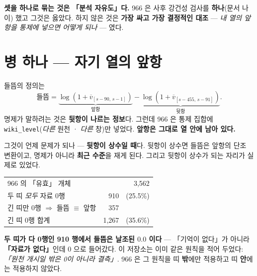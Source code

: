 \documentclass[10pt]{article}
\begin{document}
\textbf{셋을 하나로 묶는 것은 「분석 자유도」다.} 966 은 사후 강건성 검사를
\textbf{하나}(문서 나이) 했고 그것은 옳았다. 하지 않은 것은 \textbf{가장 싸고 가장
결정적인 대조} --- \emph{내 열의 앞항을 통제에 넣으면 어떻게 되나} --- 였다.

\section{병 하나 --- 자기 열의 앞항}

들뜸의 정의는
\[
\text{들뜸}=\underbrace{\log(1+\overline{v}_{[s-90,\,s-1]})}_{\text{앞항}}
          -\underbrace{\log(1+\overline{v}_{[s-455,\,s-91]})}_{\text{뒷항}} .
\]
명제가 말하려는 것은 \textbf{뒷항이 나르는 정보}다. 그런데 966 은 통제 집합에
\texttt{wiki\_level}(\emph{다른} 원천 · \emph{다른} 창)만 넣었다. \textbf{앞항은
그대로 열 안에 남아 있다.}

그것이 언제 문제가 되나 --- \textbf{뒷항이 상수일 때}다. 뒷항이 상수면 들뜸은
앞항의 단조 변환이고, 명제가 아니라 \textbf{최근 수준}을 재게 된다. 그리고 뒷항이
상수가 되는 자리가 실제로 있었다.

\begin{center}\small
\begin{tabular}{lrr}
\hline
966 의 「유효」 개체 & \multicolumn{2}{r}{3{,}562}\\
\quad 두 띠 \emph{모두} 자료 0행 & 910 & (25.5\%)\\
\quad 긴 띠만 0행 $\Rightarrow$ 들뜸 $\equiv$ 앞항 & 357 & \\
\quad 긴 띠 0행 합계 & 1{,}267 & (35.6\%)\\
\hline
\end{tabular}
\end{center}

\textbf{두 띠가 다 0행인 910 행에서 들뜸은 날조된 $0.0$ 이다} --- 「기억이 없다」가
아니라 \textbf{「자료가 없다」}인데 $0$ 으로 들어갔다. 이 저장소는 이미 같은 원칙을
적어 두었다: \emph{「원천 개시일 밖은 0이 아니라 결측」}. 966 은 그 원칙을 띠
\textbf{밖}에만 적용하고 띠 \textbf{안}에는 적용하지 않았다.

\end{document}
